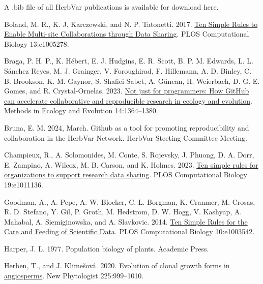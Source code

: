 \documentclass[
  letterpaper,
  DIV=11,
  numbers=noendperiod]{scrreprt}
\newlength{\cslhangindent}
\newenvironment{CSLReferences}[2] %
 {\begin{list}{}{%
  \setlength{\itemindent}{0pt}
  \setlength{\leftmargin}{0pt}
  \setlength{\parsep}{0pt}
  \ifodd #1
   \setlength{\leftmargin}{\cslhangindent}
   \setlength{\itemindent}{-1\cslhangindent}
  \fi
  \setlength{\itemsep}{#2\baselineskip}}}
 {\end{list}}
\begin{document}
A .bib file of all HerbVar publications is available for download here.

\label{refs}
\begin{CSLReferences}{1}{0}
Boland, M. R., K. J. Karczewski, and N. P. Tatonetti. 2017.
\href{https://doi.org/10.1371/journal.pcbi.1005278}{Ten {Simple Rules}
to {Enable Multi-site Collaborations} through {Data Sharing}}. PLOS
Computational Biology 13:e1005278.

Braga, P. H. P., K. Hébert, E. J. Hudgins, E. R. Scott, B. P. M.
Edwards, L. L. Sánchez Reyes, M. J. Grainger, V. Foroughirad, F.
Hillemann, A. D. Binley, C. B. Brookson, K. M. Gaynor, S. Shafiei Sabet,
A. Güncan, H. Weierbach, D. G. E. Gomes, and R. Crystal-Ornelas. 2023.
\href{https://doi.org/10.1111/2041-210X.14108}{Not just for programmers:
{How GitHub} can accelerate collaborative and reproducible research in
ecology and evolution}. Methods in Ecology and Evolution 14:1364--1380.

Bruna, E. M. 2024, March. Github as a tool for promoting reproducibility
and collaboration in the {HerbVar Network}. HerbVar Steeting Committee
Meeting.

Champieux, R., A. Solomonides, M. Conte, S. Rojevsky, J. Phuong, D. A.
Dorr, E. Zampino, A. Wilcox, M. B. Carson, and K. Holmes. 2023.
\href{https://doi.org/10.1371/journal.pcbi.1011136}{Ten simple rules for
organizations to support research data sharing}. PLOS Computational
Biology 19:e1011136.

Goodman, A., A. Pepe, A. W. Blocker, C. L. Borgman, K. Cranmer, M.
Crosas, R. D. Stefano, Y. Gil, P. Groth, M. Hedstrom, D. W. Hogg, V.
Kashyap, A. Mahabal, A. Siemiginowska, and A. Slavkovic. 2014.
\href{https://doi.org/10.1371/journal.pcbi.1003542}{Ten {Simple Rules}
for the {Care} and {Feeding} of {Scientific Data}}. PLOS Computational
Biology 10:e1003542.

Harper, J. L. 1977. Population biology of plants. Academic Press.

Herben, T., and J. Klimešová. 2020.
\href{https://doi.org/10.1111/nph.16188}{Evolution of clonal growth
forms in angiosperms}. New Phytologist 225:999--1010.


\end{CSLReferences}
\end{document}
